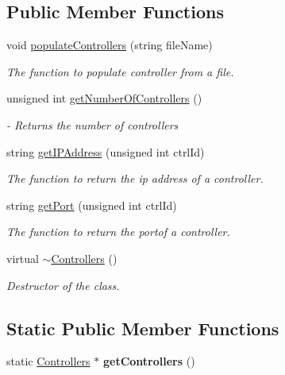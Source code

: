 \subsection*{\-Public \-Member \-Functions}
\begin{DoxyCompactItemize}
\item 
void \hyperlink{classControllers_ac6623105f2ae4a17ba25bfdfb3b71100}{populate\-Controllers} (string file\-Name)
\begin{DoxyCompactList}\small\item\em \-The function to populate controller from a file. \end{DoxyCompactList}\item 
\hypertarget{classControllers_a5d70c9cefe0f9d9f3b3645238d635dca}{unsigned int \hyperlink{classControllers_a5d70c9cefe0f9d9f3b3645238d635dca}{get\-Number\-Of\-Controllers} ()}\label{classControllers_a5d70c9cefe0f9d9f3b3645238d635dca}

\begin{DoxyCompactList}\small\item\em -\/ \-Returns the number of controllers \end{DoxyCompactList}\item 
string \hyperlink{classControllers_a7a87e9db1f4f10a0702e0ba13d772a97}{get\-I\-P\-Address} (unsigned int ctrl\-Id)
\begin{DoxyCompactList}\small\item\em \-The function to return the ip address of a controller. \end{DoxyCompactList}\item 
string \hyperlink{classControllers_a03171f2ca753df4f2f09749c2720e192}{get\-Port} (unsigned int ctrl\-Id)
\begin{DoxyCompactList}\small\item\em \-The function to return the portof a controller. \end{DoxyCompactList}\item 
\hypertarget{classControllers_aaf8f766b52c5f2807836439367add513}{virtual \hyperlink{classControllers_aaf8f766b52c5f2807836439367add513}{$\sim$\-Controllers} ()}\label{classControllers_aaf8f766b52c5f2807836439367add513}

\begin{DoxyCompactList}\small\item\em \-Destructor of the class. \end{DoxyCompactList}\end{DoxyCompactItemize}
\subsection*{\-Static \-Public \-Member \-Functions}
\begin{DoxyCompactItemize}
\item 
\hypertarget{classControllers_a73de3d32d2e538ec833959619295527c}{static \hyperlink{classControllers}{\-Controllers} $\ast$ {\bfseries get\-Controllers} ()}\label{classControllers_a73de3d32d2e538ec833959619295527c}

\end{DoxyCompactItemize}
